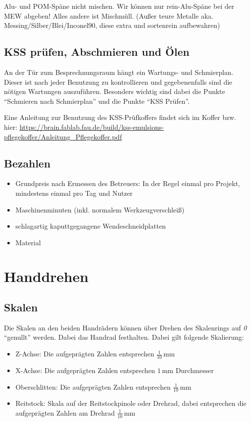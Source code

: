 \documentclass{\basedir/fablab-document}
\begin{document}
Alu- und POM-Späne nicht mischen. Wir können nur rein-Alu-Späne bei der MEW abgeben! Alles andere ist Mischmüll. (Außer teure Metalle aka. Messing/Silber/Blei/Inconel90, diese extra und sortenrein aufbewahren)

\subsection{KSS prüfen, Abschmieren und Ölen}
An der Tür zum Besprechnungsraum hängt ein Wartungs- und Schmierplan. Dieser ist nach jeder Benutzung zu kontrollieren und gegebenenfalls sind die nötigen Wartungen auszuführen. Besonders wichtig sind dabei die Punkte \enquote{Schmieren nach Schmierplan} und die Punkte \enquote{KSS Prüfen}.

Eine Anleitung zur Benutzung des KSS-Prüfkoffers findet sich im Koffer bzw. hier: \url{https://brain.fablab.fau.de/build/kss-emulsions-pflegekoffer/Anleitung_Pflegekoffer.pdf}


\subsection{Bezahlen}
\begin{itemize}
 \item Grundpreis nach Ermessen des Betreuers: In der Regel einmal pro Projekt, mindestens einmal pro Tag und Nutzer
 \item Maschinenminuten (inkl. normalem Werkzeugverschleiß)
 \item schlagartig kaputtgegangene Wendeschneidplatten
 \item Material
\end{itemize}




\newpage
\section{Handdrehen}
\label{handdrehen}
\subsection{Skalen}

Die Skalen an den beiden Handrädern können über Drehen des Skalenrings auf \emph{0} \enquote{genullt} werden.
Dabei das Handrad festhalten.
Dabei gilt folgende Skalierung:
\begin{itemize}
\item Z-Achse: Die aufgeprägten Zahlen entsprechen $\frac{1}{10}$\,mm 
\item X-Achse: Die aufgeprägten Zahlen entsprechen $1$\,mm Durchmesser
\item Oberschlitten: Die aufgeprägten Zahlen entsprechen $\frac{1}{10}$\,mm 
\item Reitstock: Skala auf der Reitstockpinole oder Drehrad, dabei entsprechen die aufgeprägten Zahlen am Drehrad $\frac{1}{10}$\,mm
\end{itemize}
\end{document}
